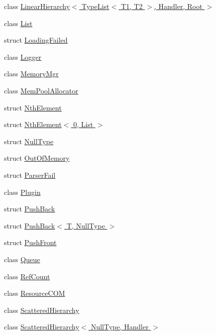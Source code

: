 \begin{DoxyCompactItemize}
\item 
class \hyperlink{class_agmd_utilities_1_1_linear_hierarchy_3_01_type_list_3_01_t1_00_01_t2_01_4_00_01_handler_00_01_root_01_4}{Linear\+Hierarchy$<$ Type\+List$<$ T1, T2 $>$, Handler, Root $>$}
\item 
class \hyperlink{class_agmd_utilities_1_1_list}{List}
\item 
struct \hyperlink{struct_agmd_utilities_1_1_loading_failed}{Loading\+Failed}
\item 
class \hyperlink{class_agmd_utilities_1_1_logger}{Logger}
\item 
class \hyperlink{class_agmd_utilities_1_1_memory_mgr}{Memory\+Mgr}
\item 
class \hyperlink{class_agmd_utilities_1_1_mem_pool_allocator}{Mem\+Pool\+Allocator}
\item 
struct \hyperlink{struct_agmd_utilities_1_1_nth_element}{Nth\+Element}
\item 
struct \hyperlink{struct_agmd_utilities_1_1_nth_element_3_010_00_01_list_01_4}{Nth\+Element$<$ 0, List $>$}
\item 
struct \hyperlink{struct_agmd_utilities_1_1_null_type}{Null\+Type}
\item 
struct \hyperlink{struct_agmd_utilities_1_1_out_of_memory}{Out\+Of\+Memory}
\item 
struct \hyperlink{struct_agmd_utilities_1_1_parser_fail}{Parser\+Fail}
\item 
class \hyperlink{class_agmd_utilities_1_1_plugin}{Plugin}
\item 
struct \hyperlink{struct_agmd_utilities_1_1_push_back}{Push\+Back}
\item 
struct \hyperlink{struct_agmd_utilities_1_1_push_back_3_01_t_00_01_null_type_01_4}{Push\+Back$<$ T, Null\+Type $>$}
\item 
struct \hyperlink{struct_agmd_utilities_1_1_push_front}{Push\+Front}
\item 
class \hyperlink{class_agmd_utilities_1_1_queue}{Queue}
\item 
class \hyperlink{class_agmd_utilities_1_1_ref_count}{Ref\+Count}
\item 
class \hyperlink{class_agmd_utilities_1_1_resource_c_o_m}{Resource\+C\+O\+M}
\item 
class \hyperlink{class_agmd_utilities_1_1_scattered_hierarchy}{Scattered\+Hierarchy}
\item 
class \hyperlink{class_agmd_utilities_1_1_scattered_hierarchy_3_01_null_type_00_01_handler_01_4}{Scattered\+Hierarchy$<$ Null\+Type, Handler $>$}

\end{DoxyCompactItemize}

